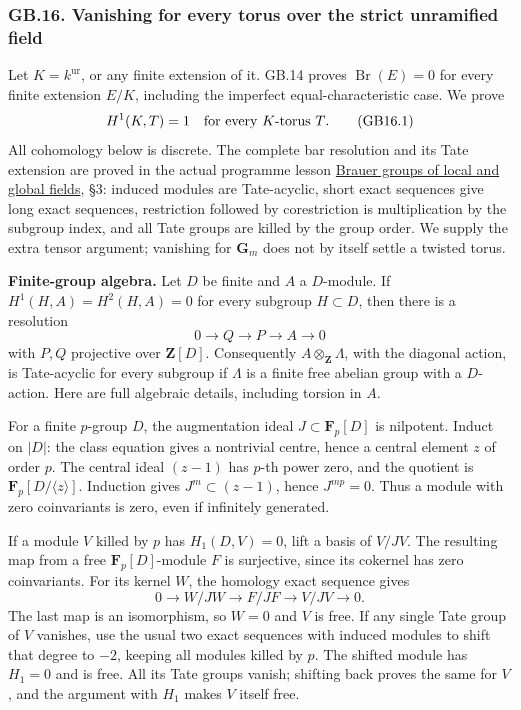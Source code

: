 \documentclass[
  11pt,
]{article}
\begin{document}
\subsubsection{GB.16. Vanishing for every torus over the strict
unramified
field}\label{gb.16.-vanishing-for-every-torus-over-the-strict-unramified-field}

Let \(K=k^{\mathrm{ur}}\), or any finite extension of it. GB.14 proves
\(\operatorname{Br}(E)=0\) for every finite extension \(E/K\), including
the imperfect equal-characteristic case. We prove \[
                         H^1(K,T)=1
                 \quad\hbox{for every \(K\)-torus \(T\)}.       \tag{GB16.1}
\] All cohomology below is discrete. The complete bar resolution and its
Tate extension are proved in the actual programme lesson
\href{../NT-CFT/brauer-groups-of-local-and-global-fields.html}{Brauer
groups of local and global fields}, §3: induced modules are
Tate-acyclic, short exact sequences give long exact sequences,
restriction followed by corestriction is multiplication by the subgroup
index, and all Tate groups are killed by the group order. We supply the
extra tensor argument; vanishing for \(\mathbf G_m\) does not by itself
settle a twisted torus.

\textbf{Finite-group algebra.} Let \(D\) be finite and \(A\) a
\(D\)-module. If \(H^1(H,A)=H^2(H,A)=0\) for every subgroup
\(H\subset D\), then there is a resolution \[
 0\longrightarrow Q\longrightarrow P\longrightarrow A
                      \longrightarrow0                       \tag{GB16.2}
\] with \(P,Q\) projective over \(\mathbf Z[D]\). Consequently
\(A\otimes_{\mathbf Z}\Lambda\), with the diagonal action, is
Tate-acyclic for every subgroup if \(\Lambda\) is a finite free abelian
group with a \(D\)-action. Here are full algebraic details, including
torsion in \(A\).

For a finite \(p\)-group \(D\), the augmentation ideal
\(J\subset\mathbf F_p[D]\) is nilpotent. Induct on \(|D|\): the class
equation gives a nontrivial centre, hence a central element \(z\) of
order \(p\). The central ideal \((z-1)\) has \(p\)-th power zero, and
the quotient is \(\mathbf F_p[D/\langle z\rangle]\). Induction gives
\(J^m\subset(z-1)\), hence \(J^{mp}=0\). Thus a module with zero
coinvariants is zero, even if infinitely generated.

If a module \(V\) killed by \(p\) has \(H_1(D,V)=0\), lift a basis of
\(V/JV\). The resulting map from a free \(\mathbf F_p[D]\)-module \(F\)
is surjective, since its cokernel has zero coinvariants. For its kernel
\(W\), the homology exact sequence gives \[
 0\longrightarrow W/JW\longrightarrow F/JF
                    \longrightarrow V/JV\longrightarrow0 .
\] The last map is an isomorphism, so \(W=0\) and \(V\) is free. If any
single Tate group of \(V\) vanishes, use the usual two exact sequences
with induced modules to shift that degree to \(-2\), keeping all modules
killed by \(p\). The shifted module has \(H_1=0\) and is free. All its
Tate groups vanish; shifting back proves the same for \(V\), and the
argument with \(H_1\) makes \(V\) itself free.
\end{document}
